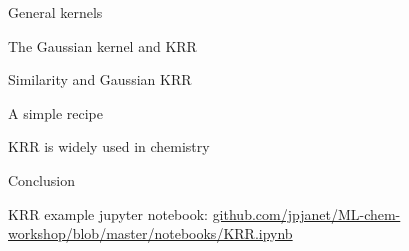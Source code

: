 \begin{frame}[t]{General kernels}

\end{frame}
\begin{frame}[t]{The Gaussian kernel and KRR}

\end{frame}
\begin{frame}[t]{Similarity and Gaussian KRR}

\end{frame}
\begin{frame}[t]{A simple recipe}

\end{frame}
\begin{frame}{KRR is widely used in chemistry}

\end{frame}
\begin{frame}{Conclusion}

\end{frame}

\begin{frame}{KRR example}
jupyter notebook: \url{github.com/jpjanet/ML-chem-workshop/blob/master/notebooks/KRR.ipynb}
\end{frame}
